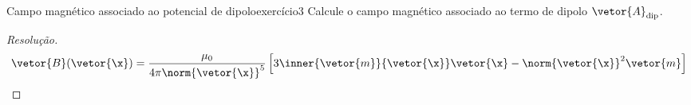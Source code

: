 \begin{exercício}{Campo magnético associado ao potencial de dipolo}{exercício3}
    Calcule o campo magnético associado ao termo de dipolo \(\vetor{A}_\mathrm{dip}\).
\end{exercício}
\begin{proof}[Resolução]
    \begin{equation*}
        \vetor{B}(\vetor{\x}) = \frac{\mu_0}{4\pi \norm{\vetor{\x}}^5}\left[3\inner{\vetor{m}}{\vetor{\x}}\vetor{\x} - \norm{\vetor{\x}}^2 \vetor{m}\right]
    \end{equation*}
\end{proof}

